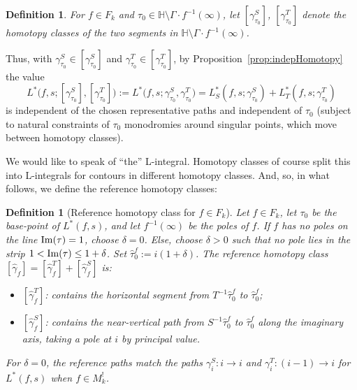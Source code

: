 \documentclass[11pt]{article}
\newtheorem{definition}[theorem]{Definition}
\newcommand{\HH}{\mathbb{H}}
\begin{document}
\begin{definition}\label{def:class}
For $f\in F_k$ and $\tau_0\in\HH\setminus\Gamma\!\cdot\!f^{-1}(\infty)$, let
$[\gamma^S_{\tau_0}]$, $[\gamma^T_{\tau_0}]$ denote the homotopy classes of the two
segments in $\HH\setminus\Gamma\!\cdot\!f^{-1}(\infty)$.
\end{definition}

Thus, with $\gamma^S_{\tau_0} \in [\gamma^S_{\tau_0}]$ and 
$\gamma^T_{\tau_0} \in [\gamma^T_{\tau_0}]$, by Proposition~\ref{prop:indepHomotopy} 
the value
\begin{equation}\label{eq:Lclass}
L^*\big(f,s;[\gamma^S_{\tau_0}],[\gamma^T_{\tau_0}]\big) 
:= L^*\big(f,s;\gamma^S_{\tau_0} , \gamma^T_{\tau_0}\big)
= L^*_S(f,s;\gamma^S_{\tau_0}) + L^*_T(f,s;\gamma^T_{\tau_0})
\end{equation}
is independent of the chosen representative paths and independent of $\tau_0$ (subject to 
natural constraints of $\tau_0$ monodromies around singular points, which move between 
homotopy classes).

We would like to speak of ``the'' L-integral. Homotopy classes of course split this into 
L-integrals for contours in different homotopy classes. And, so, in what follows, we define 
the reference homotopy classes: 
\begin{definition}[Reference homotopy class for $f \in F_k$]\label{def:null_homotopy}
Let $f\in F_k$, let $\tau_0$ be the base-point of $L^*(f,s)$, and let $f^{-1}(\infty)$ be the
poles of $f$. If $f$ has no poles on the line ${\rm Im}(\tau) = 1$, choose $\delta = 0$. 
Else, choose $\delta>0$ such that no pole lies in the strip $1<{\rm Im}(\tau)\leq 1+\delta$. 
Set $\hat\tau_0^f:=i(1+\delta)$. The \emph{reference homotopy class}
$[\hat\gamma_f]=[\hat\gamma_f^T]+[\hat\gamma_f^S]$ is:
\begin{itemize}
\item $[\hat\gamma_f^T]$: contains the horizontal segment from $T^{-1}\hat\tau_0^f$ to $\hat\tau_0^f$;
\item $[\hat\gamma_f^S]$: contains the near-vertical path from $S^{-1}\hat\tau_0^f$ to $\hat\tau_0^f$
along the imaginary axis, taking a pole at $i$ by principal value.
\end{itemize}
For $\delta=0$, the reference paths match the paths $\gamma^S_i\!:\! i \!\to\! i$ and $\gamma^T_i\!:\! (i\!-\!1)\!\to\! i$ for $L^*(f,s)$ when $f \in M_k^!$.
\end{definition}

\end{document}
